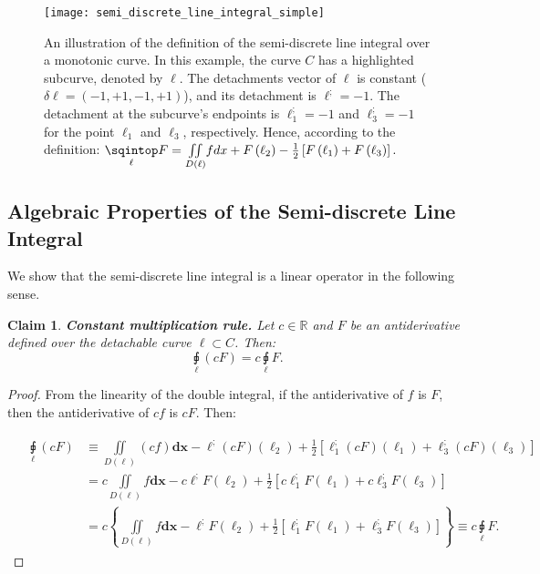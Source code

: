 \documentclass[11pt]{book}
\newtheorem{clm}[thm]{Claim}
\begin{document}
\begin{figure}
\texttt{[image: semi\_discrete\_line\_integral\_simple]}
\caption{An illustration of the definition of the semi-discrete line integral
over a monotonic curve. In this example, the curve $C$ has a highlighted
subcurve, denoted by $\ell$. The detachments vector of $\ell$ is constant
($\delta\ell=\left(-1,+1,-1,+1\right)$), and its detachment is $\ell^{;}=-1$.
The detachment at the subcurve's endpoints
is $\ell_{1}^{;}=-1$ and $\ell_{3}^{;}=-1$ for the point $\ell_{1}$
and $\ell_{3}$, respectively. Hence, according to the definition: $\underset{\ell}{\sqintop}F=\underset{D\left(\ell\right)}{\iint}fdx+F\left(\ell_{2}\right)-\frac{1}{2}\left[F\left(\ell_{1}\right)+F\left(\ell_{3}\right)\right].$}
\end{figure}
\subsection{Algebraic Properties of the Semi-discrete Line Integral}\label{semi_discrete_line_integral_algbebra}


We show that the semi-discrete line integral is a linear operator in the following sense.

\begin{clm}\textbf{Constant multiplication rule.} Let $c\in\mathbb{R}$ and $F$ be an antiderivative defined over the detachable curve $\ell\subset C$. Then:
$$\underset{\ell}{\sqint}\left(c F\right) = c\underset{\ell}{\sqint} F.$$
\end{clm}
\begin{proof}From the linearity of the double integral, if the antiderivative of $f$ is $F$, then the antiderivative of $c f$ is $c F$. Then:

\begin{align}
&\begin{aligned}
\underset{\ell}{\sqint}\left(cF\right) & \equiv\underset{D\left(\ell\right)}{\iint}\left(cf\right)\boldsymbol{dx}-\ell^{;}\left(cF\right)\left(\ell_{2}\right)+\frac{1}{2}\left[\ell_{1}^{;}\left(cF\right)\left(\ell_{1}\right)+\ell_{3}^{;}\left(cF\right)\left(\ell_{3}\right)\right]\\
 & =c\underset{D\left(\ell\right)}{\iint}f\boldsymbol{dx}-c\ell^{;}F\left(\ell_{2}\right)+\frac{1}{2}\left[c\ell_{1}^{;}F\left(\ell_{1}\right)+c\ell_{3}^{;}F\left(\ell_{3}\right)\right]\\
 & =c\left\{\underset{D\left(\ell\right)}{\iint}f\boldsymbol{dx}-\ell^{;}F\left(\ell_{2}\right)+\frac{1}{2}\left[\ell_{1}^{;}F\left(\ell_{1}\right)+\ell_{3}^{;}F\left(\ell_{3}\right)\right]\right\} \equiv c\underset{\ell}{\sqint}F.
\end{aligned}
\end{align}

\end{proof}
\end{document}
